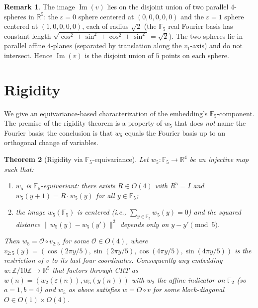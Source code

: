 \documentclass[11pt,reqno]{amsart}
\newtheorem{theorem}{Theorem}[section]
\theoremstyle{definition}
\newtheorem{remark}[theorem]{Remark}
\newcommand{\Z}{\mathbb{Z}}
\newcommand{\R}{\mathbb{R}}
\newcommand{\F}{\mathbb{F}}
\DeclareMathOperator{\Img}{Im}
\begin{document}
\begin{remark}
\label{rem:dim}
The image $\Img(v)$ lies on the disjoint union of two parallel
$4$-spheres in $\R^5$: the $\varepsilon = 0$ sphere centered at
$(0,0,0,0,0)$ and the $\varepsilon = 1$ sphere centered at
$(1,0,0,0,0)$, each of radius $\sqrt{2}$ (the $\F_5$ real Fourier
basis has constant length $\sqrt{\cos^{2} + \sin^{2} + \cos^{2} +
\sin^{2}} = \sqrt{2}$). The two spheres lie in parallel affine
$4$-planes (separated by translation along the $v_{1}$-axis) and do
not intersect. Hence $\Img(v)$ is the disjoint union of $5$ points
on each sphere.
\end{remark}

\section{Rigidity}
\label{sec:rigidity}

We give an equivariance-based characterization of the embedding's
$\F_{5}$-component. The premise of the rigidity theorem is a
property of $w_{5}$ that does \emph{not} name the Fourier basis;
the conclusion is that $w_{5}$ equals the Fourier basis up to an
orthogonal change of variables.

\begin{theorem}[Rigidity via $\F_{5}$-equivariance]
\label{thm:rigidity}
Let $w_{5}: \F_{5} \to \R^{4}$ be an injective map such that:
\begin{enumerate}[label=\textup{(\roman*)},leftmargin=*]
\item $w_{5}$ is $\F_{5}$-equivariant: there exists
  $R \in O(4)$ with $R^{5} = I$ and
  $w_{5}(y + 1) = R \cdot w_{5}(y)$ for all $y \in \F_{5}$;
\item the image $w_{5}(\F_{5})$ is centered (i.e.,
  $\sum_{y \in \F_{5}} w_{5}(y) = 0$) and the squared distance
  $\|w_{5}(y) - w_{5}(y')\|^{2}$ depends only on $y - y' \pmod 5$.
\end{enumerate}
Then $w_{5} = \mathcal{O} \circ v_{2:5}$ for some
$\mathcal{O} \in O(4)$, where $v_{2:5}(y) = (\cos(2\pi y / 5),
\sin(2\pi y / 5), \cos(4\pi y / 5), \sin(4\pi y / 5))$ is the
restriction of $v$ to its last four coordinates. Consequently any
embedding $w: \Z/10\Z \to \R^{5}$ that factors through CRT as
$w(n) = (w_{2}(\varepsilon(n)), w_{5}(y(n)))$ with $w_{2}$ the
affine indicator on $\F_{2}$ (so $a = 1, b = 4$) and $w_{5}$ as
above satisfies $w = O \circ v$ for some block-diagonal
$O \in O(1) \times O(4)$.
\end{theorem}
\end{document}
